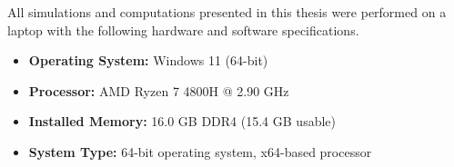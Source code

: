 All simulations and computations presented in this thesis were performed on a laptop with the following hardware and software specifications.

\begin{itemize}
    \item \textbf{Operating System:} Windows 11 (64-bit)
    \item \textbf{Processor:} AMD Ryzen 7 4800H @ 2.90 GHz
    \item \textbf{Installed Memory:} 16.0 GB DDR4 (15.4 GB usable)
    \item \textbf{System Type:} 64-bit operating system, x64-based processor
\end{itemize}

